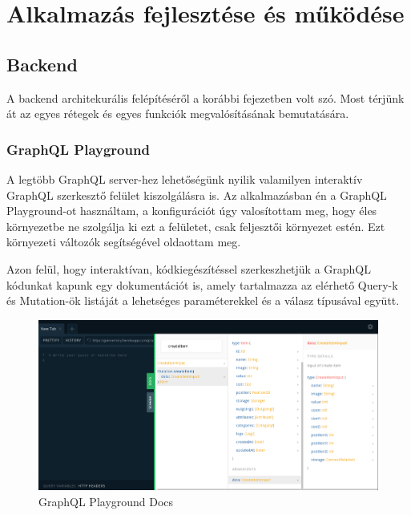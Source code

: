 
\chapter{Alkalmazás fejlesztése és működése}

\section{Backend}
A backend architekurális felépítéséről a korábbi fejezetben volt szó. 
Most térjünk át az egyes rétegek és egyes funkciók megvalósításának bemutatására.

\subsection{GraphQL Playground}
A legtöbb GraphQL server-hez lehetőségünk nyilik valamilyen interaktív GraphQL szerkesztő felület kiszolgálásra is.
Az alkalmazásban én a GraphQL Playground-ot használtam, a konfigurációt úgy valosítottam meg, hogy éles környezetbe ne szolgálja ki ezt a felületet, csak feljesztői környezet estén.
Ezt környezeti változók segítségével oldaottam meg.

Azon felül, hogy interaktívan, kódkiegészítéssel szerkeszhetjük a GraphQL kódunkat kapunk egy dokumentációt is, amely tartalmazza az elérhető Query-k és Mutation-ök listáját a lehetséges paraméterekkel és a válasz típusával együtt.

\begin{figure}[!ht]
  \centering
  \includegraphics[width=150mm, keepaspectratio]{figures/playground_docs.png}
  \caption{GraphQL Playground Docs}
  \label{fig:playgroundDocs}
\end{figure}

